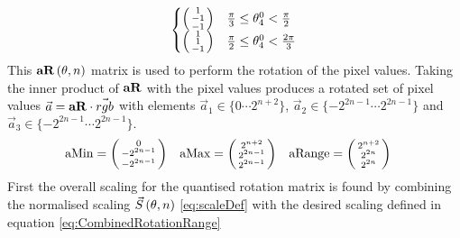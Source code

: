 \begin{gather*}
\begin{aligned}
\begin{cases}
\left( \begin{smallmatrix}  1 \\  -1 \\ -1\\ \end{smallmatrix} \right) & \frac{\pi }{3} \leq  \theta_4^0  < \frac{  \pi }{2} \\
\left( \begin{smallmatrix}  1 \\    1 \\ -1\\ \end{smallmatrix} \right) & \frac{\pi }{2} \leq  \theta_4^0  < \frac{2\pi }{3} 
\end{cases} 
\end{aligned} \\
\end{gather*}
This $\aR[\theta, n]$ matrix is used to perform the rotation of the pixel values. Taking the inner product of $\aR$ with the pixel values produces 
a rotated set of pixel values $\vec{a} = \aR \cdot \vec{rgb}$ with elements $ \vec{a}_1 \in \{0 \cdots 2^{n+2} \}$,  $ \vec{a}_2 \in \{-2^{2n-1} \cdots 2^{2n-1} \}$ and $ \vec{a}_3 \in \{-2^{2n-1} \cdots 2^{2n-1} \}$. 
\begin{align*}
\text{aMin}     &= \left( \begin{smallmatrix}  0           \\  -2^{2n-1}  \\ -2^{2n-1} \\ \end{smallmatrix} \right) & 
\text{aMax}    &= \left( \begin{smallmatrix}  2^{n+2} \\    2^{2n-1}  \\   2^{2n-1} \\ \end{smallmatrix} \right) & 
\text{aRange} &= \left( \begin{smallmatrix}  2^{n+2} \\    2^{2n}      \\   2^{2n}     \\ \end{smallmatrix} \right) 
\end{align*}
First the overall scaling for the quantised rotation matrix is found by combining the normalised scaling $\Scale[\theta, n]$ \ref{eq:scaleDef} with the desired scaling defined in equation \ref{eq:CombinedRotationRange}

